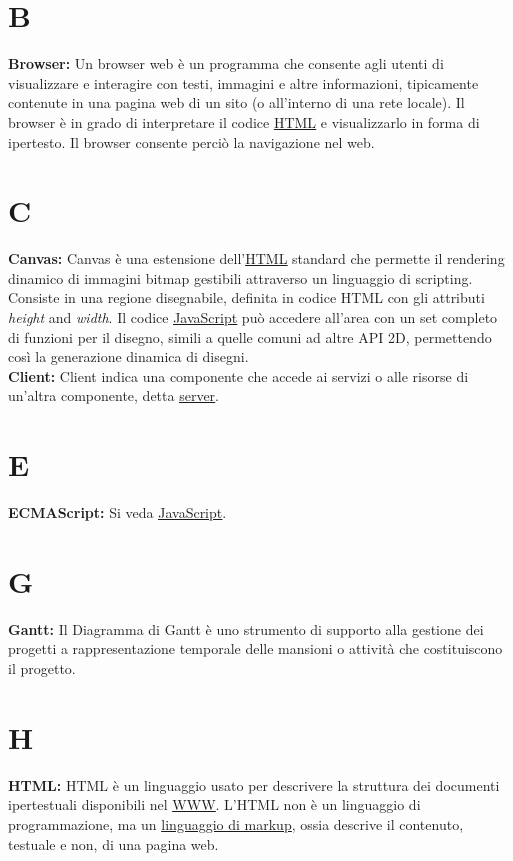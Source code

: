 \section*{B}
\hypertarget{browser}{}
\textbf{Browser:}
Un browser web \` e un programma che consente agli utenti di visualizzare e interagire con testi, immagini e altre informazioni, tipicamente contenute in una pagina web di un sito (o all'interno di una rete locale).
Il browser \` e in grado di interpretare il codice \hyperlink{html}{\underline{HTML}} e visualizzarlo in forma di ipertesto. Il browser consente perci\` o la navigazione nel web.\\

\section*{C}
\hypertarget{canvas}{}
\textbf{Canvas:}
Canvas \` e una estensione dell'\hyperlink{html}{\underline{HTML}} standard che permette il rendering dinamico di immagini bitmap gestibili attraverso un linguaggio di scripting.  Consiste in una regione disegnabile, definita in codice HTML con gli attributi \textit{height} and \textit{width}. Il codice \hyperlink{javascript}{\underline{JavaScript}} pu\`o accedere all'area con un set completo di funzioni per il disegno, simili a quelle comuni ad altre API 2D, permettendo cos\`i la generazione dinamica di disegni.\\

\hypertarget{client}{}
\textbf{Client:}
Client indica una componente che accede ai servizi o alle risorse di un'altra componente, detta \hyperlink{server}{\underline{server}}.\\

\section*{E}
\hypertarget{ecmascript}{}
\textbf{ECMAScript:}
\text Si veda \hyperlink{javascript}{\underline{JavaScript}}.\\

\section*{G}
\hypertarget{gantt}{}
\textbf{Gantt:}
Il Diagramma di Gantt \` e uno strumento di supporto alla gestione dei progetti a rappresentazione temporale delle mansioni o attivit\`a che costituiscono il progetto. \\

\section*{H}
\hypertarget{html}{}
\textbf{HTML:}
HTML \` e un linguaggio usato per descrivere la struttura dei documenti ipertestuali disponibili nel \hyperlink{www}{\underline{WWW}}.
L'HTML non \` e un linguaggio di programmazione, ma un \hyperlink{linguaggio di markup}{\underline{linguaggio di markup}}, ossia descrive il contenuto, testuale e non, di una pagina web.\\

